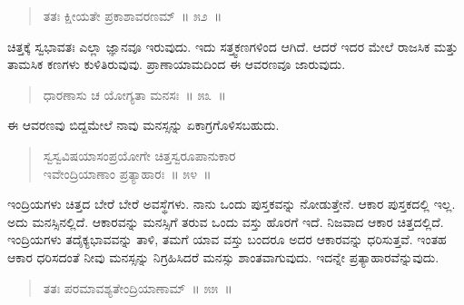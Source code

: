 \vspace{-0.3cm}

\begin{verse}
ತತಃ ಕ್ಷೀಯತೇ ಪ್ರಕಾಶಾವರಣಮ್​~॥ ೫೨~॥
\end{verse}

\vspace{-0.3cm}


ಚಿತ್ತಕ್ಕೆ ಸ್ವಭಾವತಃ ಎಲ್ಲಾ ಜ್ಞಾನವೂ ಇರುವುದು. ಇದು ಸತ್ತ್ವಕಣಗಳಿಂದ ಆಗಿದೆ. ಆದರೆ ಇದರ ಮೇಲೆ ರಾಜಸಿಕ ಮತ್ತು ತಾಮಸಿಕ ಕಣಗಳು ಕುಳಿತಿರುವುವು. ಪ್ರಾಣಾಯಾಮದಿಂದ ಈ ಆವರಣವೂ ಜಾರುವುದು. 

\vspace{-0.3cm}

\begin{verse}
ಧಾರಣಾಸು ಚ ಯೋಗ್ಯತಾ ಮನಸಃ~॥ ೫೩~॥
\end{verse}

\vspace{-0.3cm}

ಈ ಆವರಣವು ಬಿದ್ದಮೇಲೆ ನಾವು ಮನಸ್ಸನ್ನು ಏಕಾಗ್ರಗೊಳಿಸಬಹುದು. 


\begin{verse}
ಸ್ವಸ್ವವಿಷಯಾಸಂಪ್ರಯೋಗೇ ಚಿತ್ತಸ್ವರೂಪಾನುಕಾರ\\ ಇವೇಂದ್ರಿಯಾಣಾಂ ಪ್ರತ್ಯಾಹಾರಃ~॥ ೫೪~॥
\end{verse}



\vskip 3pt

ಇಂದ್ರಿಯಗಳು ಚಿತ್ತದ ಬೇರೆ ಬೇರೆ ಅವಸ್ಥೆಗಳು. ನಾನು ಒಂದು ಪುಸ್ತಕವನ್ನು ನೋಡುತ್ತೇನೆ. ಆಕಾರ ಪುಸ್ತಕದಲ್ಲಿ ಇಲ್ಲ. ಅದು ಮನಸ್ಸಿನಲ್ಲಿದೆ. ಆಕಾರವನ್ನು ಮನಸ್ಸಿಗೆ ತರುವ ಒಂದು ವಸ್ತು ಹೊರಗೆ ಇದೆ. ನಿಜವಾದ ಆಕಾರ ಚಿತ್ತದಲ್ಲಿದೆ. ಇಂದ್ರಿಯಗಳು ತದೈಕ್ಯಭಾವವನ್ನು ತಾಳಿ, ತಮಗೆ ಯಾವ ವಸ್ತು ಬಂದರೂ ಅದರ ಆಕಾರವನ್ನು ಧರಿಸುತ್ತವೆ. ಇಂತಹ ಆಕಾರ ಧರಿಸದಂತೆ ನೀವು ಮನಸ್ಸನ್ನು ನಿಗ್ರಹಿಸಿದರೆ ಮನಸ್ಸು ಶಾಂತವಾಗುವುದು. ಇದನ್ನೇ ಪ್ರತ್ಯಾಹಾರವೆನ್ನುವುದು. 


\begin{verse}
ತತಃ ಪರಮಾವಶ್ಯತೇಂದ್ರಿಯಾಣಾಮ್​~॥ ೫೫~॥
\end{verse}

\vspace{-0.3cm}

